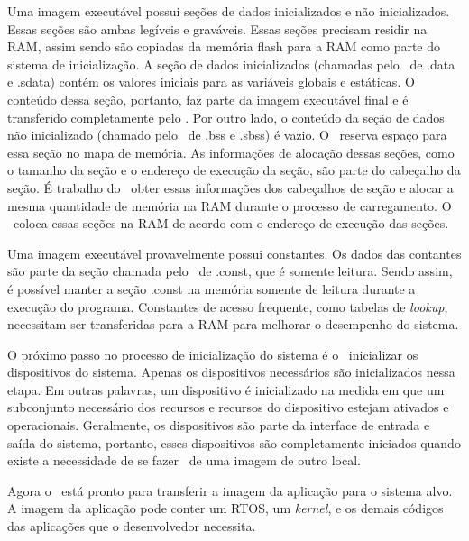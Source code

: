 Uma imagem executável possui seções de dados inicializados e não inicializados. Essas seções são ambas legíveis e graváveis. Essas seções precisam residir na RAM, assim sendo são copiadas da memória flash para a RAM como parte do sistema de inicialização. A seção de dados inicializados (chamadas pelo \linker\ de .data e .sdata) contém os valores iniciais para as variáveis globais e estáticas. O conteúdo dessa seção, portanto, faz parte da imagem executável final e é transferido completamente pelo \loader. Por outro lado, o conteúdo da seção de dados não inicializado (chamado pelo \linker\ de .bss e .sbss) é vazio. O \linker\ reserva espaço para essa seção no mapa de memória. As informações de alocação dessas seções, como o tamanho da seção e o endereço de execução da seção, são parte do cabeçalho da seção. É trabalho do \loader\ obter essas informações dos cabeçalhos de seção e alocar a mesma quantidade de memória na RAM durante o processo de carregamento. O \loader\ coloca essas seções na RAM de acordo com o endereço de execução das seções.

Uma imagem executável provavelmente possui constantes. Os dados das contantes são parte da seção chamada pelo \linker\ de .const, que é somente leitura. Sendo assim, é possível manter a seção .const na memória somente de leitura durante a execução do programa. Constantes de acesso frequente, como tabelas de \textit{lookup}, necessitam ser transferidas para a RAM para melhorar o desempenho do sistema.

O próximo passo no processo de inicialização do sistema é o \loader\ inicializar os dispositivos do sistema. Apenas os dispositivos necessários são inicializados nessa etapa. Em outras palavras, um dispositivo é inicializado na medida em que um subconjunto necessário dos recursos e recursos do dispositivo estejam ativados e operacionais. Geralmente, os dispositivos são parte da interface de entrada e saída do sistema, portanto, esses dispositivos são completamente iniciados quando existe a necessidade de se fazer \download\ de uma imagem de outro local.

Agora o \loader\ está pronto para transferir a imagem da aplicação para o sistema alvo. A imagem da aplicação pode conter um RTOS, um \textit{kernel}, e os demais códigos das aplicações que o desenvolvedor necessita.



